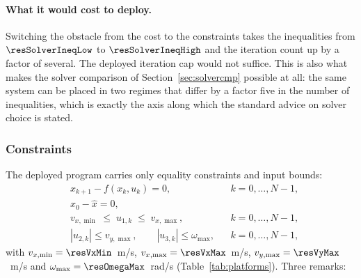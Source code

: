 \documentclass[11pt,a4paper]{article}
\begin{document}
\paragraph{What it would cost to deploy.} Switching the obstacle from the cost to the constraints takes the
inequalities from $\resSolverIneqLow$ to $\resSolverIneqHigh$ and the iteration count up by a factor of
several. The deployed iteration cap would not suffice. This is also what makes the solver comparison of
Section~\ref{sec:solvercmp} possible at all: the same system can be placed in two regimes that differ by a
factor five in the number of inequalities, which is exactly the axis along which the standard advice on
solver choice is stated.

\subsubsection{Constraints}
\label{sec:constraints}

The deployed program carries only equality constraints and input bounds:
\begin{subequations}
\label{eq:cons}
\begin{align}
  & x_{k+1}-f(x_k,u_k)=0, && k=0,\dots,N-1, \label{eq:cons-dyn}\\
  & x_0-\hat x=0, \label{eq:cons-init}\\
  & v_{x,\min}\;\le\;u_{1,k}\;\le\;v_{x,\max}, && k=0,\dots,N-1, \label{eq:cons-vx}\\
  & |u_{2,k}|\le v_{y,\max},\qquad |u_{3,k}|\le\omega_{\max}, && k=0,\dots,N-1, \label{eq:cons-vyw}
\end{align}
\end{subequations}
with $v_{x,\min}=\resVxMin$~m/s, $v_{x,\max}=\resVxMax$~m/s, $v_{y,\max}=\resVyMax$~m/s and
$\omega_{\max}=\resOmegaMax$~rad/s (Table~\ref{tab:platforms}). Three remarks:
\end{document}
